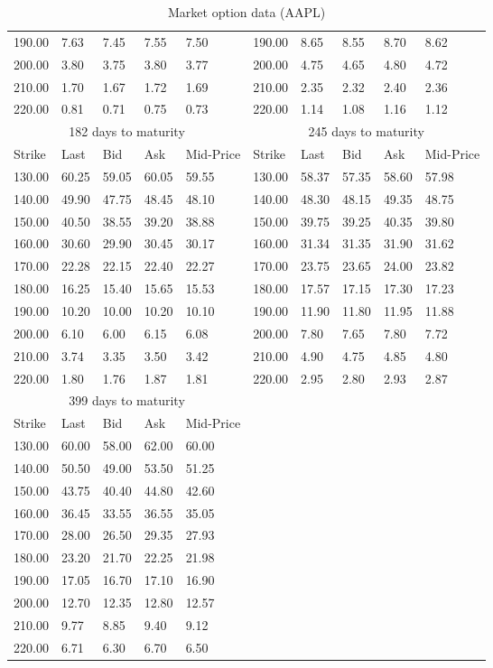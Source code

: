 \documentclass[12pt]{report}
\begin{document}
\begin{appendices}
\begin{table}[ht]
\begin{tabular}{|lllll|lllll|}
  190.00 & 7.63 & 7.45 & 7.55 & 7.50 &  190.00 & 8.65 & 8.55 & 8.70 & 8.62 \\ 
  200.00 & 3.80 & 3.75 & 3.80 & 3.77 &  200.00 & 4.75 & 4.65 & 4.80 & 4.72 \\ 
  210.00 & 1.70 & 1.67 & 1.72 & 1.69 &  210.00 & 2.35 & 2.32 & 2.40 & 2.36 \\ 
  220.00 & 0.81 & 0.71 & 0.75 & 0.73 &  220.00 & 1.14 & 1.08 & 1.16 & 1.12 \\ 
  \hline
  \multicolumn{5}{|c|}{182 days to maturity} & \multicolumn{5}{c|}{245 days to maturity} \\
  \hline
  Strike & Last & Bid & Ask & Mid-Price & Strike & Last & Bid & Ask & Mid-Price \\
  \hline
  130.00 & 60.25 & 59.05 & 60.05 & 59.55 &  130.00 & 58.37 & 57.35 & 58.60 & 57.98 \\ 
  140.00 & 49.90 & 47.75 & 48.45 & 48.10 &  140.00 & 48.30 & 48.15 & 49.35 & 48.75 \\ 
  150.00 & 40.50 & 38.55 & 39.20 & 38.88 &  150.00 & 39.75 & 39.25 & 40.35 & 39.80 \\ 
  160.00 & 30.60 & 29.90 & 30.45 & 30.17 &  160.00 & 31.34 & 31.35 & 31.90 & 31.62 \\ 
  170.00 & 22.28 & 22.15 & 22.40 & 22.27 &  170.00 & 23.75 & 23.65 & 24.00 & 23.82 \\ 
  180.00 & 16.25 & 15.40 & 15.65 & 15.53 &  180.00 & 17.57 & 17.15 & 17.30 & 17.23 \\ 
  190.00 & 10.20 & 10.00 & 10.20 & 10.10 &  190.00 & 11.90 & 11.80 & 11.95 & 11.88 \\ 
  200.00 & 6.10 & 6.00 & 6.15 & 6.08 &  200.00 & 7.80 & 7.65 & 7.80 & 7.72 \\ 
  210.00 & 3.74 & 3.35 & 3.50 & 3.42 &  210.00 & 4.90 & 4.75 & 4.85 & 4.80 \\ 
  220.00 & 1.80 & 1.76 & 1.87 & 1.81 &  220.00 & 2.95 & 2.80 & 2.93 & 2.87 \\  
  \hline
  \multicolumn{5}{|c|}{399 days to maturity} \\
  \cline{1-5}
  Strike & Last & Bid & Ask & Mid-Price \\
  \cline{1-5}
  130.00 & 60.00 & 58.00 & 62.00 & 60.00 \\ 
  140.00 & 50.50 & 49.00 & 53.50 & 51.25 \\ 
  150.00 & 43.75 & 40.40 & 44.80 & 42.60 \\ 
  160.00 & 36.45 & 33.55 & 36.55 & 35.05 \\ 
  170.00 & 28.00 & 26.50 & 29.35 & 27.93 \\ 
  180.00 & 23.20 & 21.70 & 22.25 & 21.98 \\ 
  190.00 & 17.05 & 16.70 & 17.10 & 16.90 \\ 
  200.00 & 12.70 & 12.35 & 12.80 & 12.57 \\ 
  210.00 & 9.77 & 8.85 & 9.40 & 9.12 \\ 
  220.00 & 6.71 & 6.30 & 6.70 & 6.50 \\  
  \cline{1-5}
\end{tabular}
\caption{Market option data (AAPL)}
\label{t:market:option}
\end{table}



\end{appendices}
\end{document}
